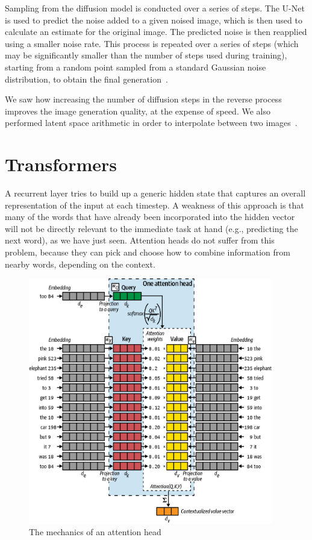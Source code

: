 Sampling from the diffusion model is conducted over a series of steps.
The U-Net is used to predict the noise added to a given noised image, which is then used to calculate an estimate for the original image.
The predicted noise is then reapplied using a smaller noise rate.
This process is repeated over a series of steps (which may be significantly smaller than the number of steps used during training), starting from a random point sampled from a standard Gaussian noise distribution, to obtain the final generation~\cite{foster2022generative}.

We saw how increasing the number of diffusion steps in the reverse process improves the image generation quality, at the expense of speed.
We also performed latent space arithmetic in order to interpolate between two images~\cite{foster2022generative}.

\section{Transformers}

A recurrent layer tries to build up a generic hidden state that captures an overall representation of the input at each timestep.
A weakness of this approach is that many of the words that have already been incorporated into the hidden vector will not be directly relevant to the immediate task at hand (e.g., predicting the next word), as we have just seen.
Attention heads do not suffer from this problem, because they can pick and choose how to combine information from nearby words, depending on the context.


\begin{figure}
	\begin{center}
		\includegraphics[width=0.95\textwidth]{figures/attention_1}
	\end{center}
	\caption{The mechanics of an attention head~\cite{foster2022generative}}\label{fig:attention_1}
\end{figure}


